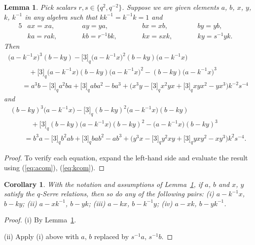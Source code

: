 \documentclass[11pt]{article}
\numberwithin{equation}{section}
\numberwithin{equation}{section}
\newtheorem{Corollary}[Theorem]{Corollary}
\newtheorem{Lemma}[Theorem]{Lemma}
\begin{document}
{\begin{Lemma}\label{lem:fact}
Pick scalars $r,s\in \big\lbrace q^2,q^{-2}\big\rbrace$. Suppose we are given elements $a$, $b$, $x$, $y$, $k$, $k^{-1}$ in any algebra such that $kk^{-1}= k^{-1}k=1$ and
\begin{alignat}{5}
& ax=xa, \qquad&&
ay=ya, \qquad&&
bx=xb, \qquad&&
by=yb,& \label{eq:acom}\\
&ka = rak, \qquad &&
kb = r^{-1} bk, \qquad&&
kx = s xk, \qquad&&
ky = s^{-1} yk.&
\label{eq:kcom}
\end{alignat}
Then
\begin{gather*}
\big(a-k^{-1}x\big)^3 (b-k y)- \lbrack 3 \rbrack_q \big(a-k^{-1}x\big)^2 (b-ky)\big(a-k^{-1}x\big)
\\
\qquad \quad{} + \lbrack 3 \rbrack_q \big(a-k^{-1}x\big) (b-ky)\big(a-k^{-1}x\big)^2 -
(b-ky)\big(a-k^{-1}x\big)^3 \\
\qquad{} = a^3 b - \lbrack 3 \rbrack_q a^2 b a + \lbrack 3 \rbrack_q a b a^2 -ba^3
 + \big(x^3 y -\lbrack 3 \rbrack_q x^2 yx+\lbrack 3 \rbrack_q xy x^2-yx^3\big) k^{-2} s^{-4}
\end{gather*}
and
\begin{gather*}
(b-ky)^3\big(a-k^{-1} x\big)- \lbrack 3 \rbrack_q (b-ky)^2 \big(a-k^{-1}x\big)(b-ky)\\
\qquad \quad {}+ \lbrack 3 \rbrack_q (b-ky) \big(a-k^{-1}x\big)(b-ky)^2 - \big(a-k^{-1}x\big)(b-ky)^3\\
\qquad{} = b^3 a -\lbrack 3 \rbrack_q b^2 a b+\lbrack 3 \rbrack_q b a b^2-ab^3
 + \big(y^3 x -\lbrack 3 \rbrack_q y^2 xy+\lbrack 3 \rbrack_q y x y^2-xy^3\big) k^2 s^{-4}.
\end{gather*}
\end{Lemma}
\begin{proof} To verify each equation, expand the left-hand side and evaluate the result using
(\ref{eq:acom}), (\ref{eq:kcom}).
\end{proof}

\begin{Corollary}\label{cor:aside}With the notation and assumptions of Lemma~{\rm \ref{lem:fact}}, if $a$, $b$ and $x$, $y$ satisfy the $q$-Serre relations, then so do any of the following pairs: {\rm (i)} $a-k^{-1}x$, $b-ky$;
{\rm (ii)} $a-xk^{-1}$, $b-yk$;
{\rm (iii)} $a-kx$, $b-k^{-1}y$;
{\rm (iv)} $a-xk$, $b-yk^{-1}$.
\end{Corollary}
\begin{proof} (i) By Lemma~\ref{lem:fact}.

(ii) Apply (i) above with $a$, $b$ replaced by $s^{-1}a$, $s^{-1}b$.


\end{proof}}
\end{document}
